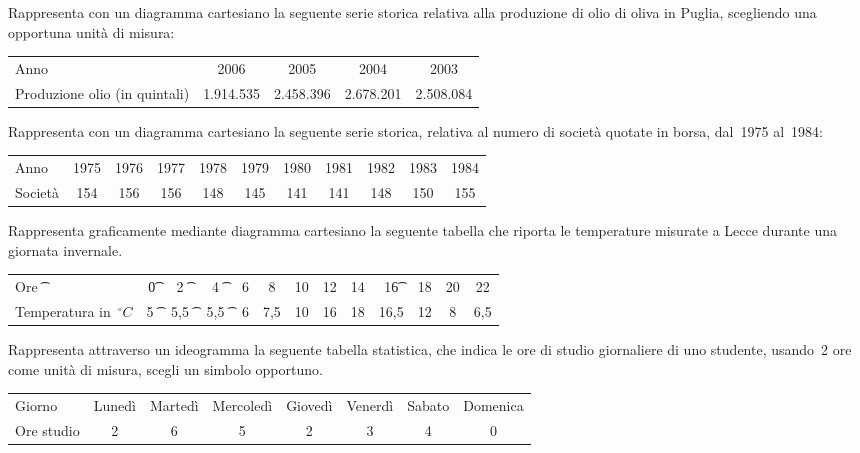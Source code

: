 \begin{esercizio}
\label{ese:A.10}
Rappresenta con un diagramma cartesiano la seguente serie storica relativa alla produzione di olio di oliva in Puglia,
scegliendo una opportuna unità di misura:
\begin{center}
 \begin{tabularx}{.9\textwidth}{Xcccc}
\toprule
Anno & 2006 & 2005 & 2004 & 2003\\
Produzione olio (in quintali)& 1.914.535 & 2.458.396 & 2.678.201 & 2.508.084\\
\bottomrule
\end{tabularx}
\end{center}
\end{esercizio}

\begin{esercizio}
\label{ese:A.11}
Rappresenta con un diagramma cartesiano la seguente serie storica, relativa al numero di società quotate in borsa, dal~1975 al~1984:
\begin{center}
 \begin{tabular}{lcccccccccc}
\toprule
Anno & 1975 & 1976 & 1977 & 1978 & 1979 & 1980 & 1981 & 1982 & 1983 & 1984 \\
Società & 154 & 156 & 156 & 148 & 145 & 141 & 141 & 148 & 150 & 155 \\
\bottomrule
\end{tabular}
\end{center}
\end{esercizio}

\begin{esercizio}
\label{ese:A.12}
Rappresenta graficamente mediante diagramma cartesiano la seguente tabella che riporta le temperature misurate a Lecce durante una giornata invernale.
\begin{center}
\begin{tabularx}{.9\textwidth}{X*{12}{c}}
\toprule
Ore \t	 & 0\t& 2 \t& 4 \t& 6 & 8  & 10 & 12 & 14 & 16\t& 18 & 20 & 22\\
Temperatura in~$\unit{^\circ C}$ & 5 \t& 5,5 \t& 5,5 \t& 6 & 7,5 & 10 & 16 & 18 & 16,5 & 12 & 8 & 6,5\\
\bottomrule
\end{tabularx}
\end{center}
\end{esercizio}


\begin{esercizio}
\label{ese:A.13}
Rappresenta attraverso un ideogramma la seguente tabella statistica, che indica le ore di studio giornaliere di uno studente,
usando~2 ore come unità di misura, scegli un simbolo opportuno.
\begin{center}
\begin{tabular}{l*{7}{c}}
\toprule
Giorno & Lunedì & Martedì & Mercoledì & Giovedì & Venerdì & Sabato & Domenica \\
Ore studio & 2 & 6 & 5 & 2 & 3 & 4 & 0 \\
\bottomrule
\end{tabular}
\end{center}
\end{esercizio}

